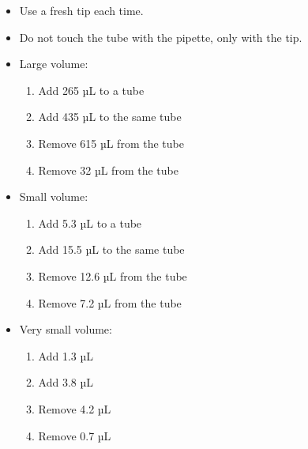 \documentclass[]{book}
\providecommand{\tightlist}{%
  \setlength{\itemsep}{0pt}\setlength{\parskip}{0pt}}
\begin{document}
\begin{itemize}
\item
  Use a fresh tip each time.
\item
  Do not touch the tube with the pipette, only with the tip.
\item
  Large volume:

  \begin{enumerate}
  \def\labelenumi{\arabic{enumi}.}
  \tightlist
  \item
    Add 265 µL to a tube
  \item
    Add 435 µL to the same tube
  \item
    Remove 615 µL from the tube
  \item
    Remove 32 µL from the tube
  \end{enumerate}
\item
  Small volume:

  \begin{enumerate}
  \def\labelenumi{\arabic{enumi}.}
  \tightlist
  \item
    Add 5.3 µL to a tube
  \item
    Add 15.5 µL to the same tube
  \item
    Remove 12.6 µL from the tube
  \item
    Remove 7.2 µL from the tube
  \end{enumerate}
\item
  Very small volume:

  \begin{enumerate}
  \def\labelenumi{\arabic{enumi}.}
  \tightlist
  \item
    Add 1.3 µL
  \item
    Add 3.8 µL
  \item
    Remove 4.2 µL
  \item
    Remove 0.7 µL
  \end{enumerate}
\end{itemize}
\end{document}
